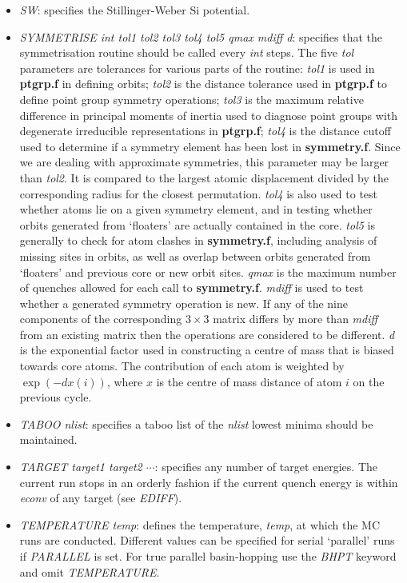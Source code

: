 \documentclass[12pt,a4paper,dvips]{article}
\begin{document}
\begin{itemize}
\item {\it SW\/}: specifies the Stillinger-Weber Si potential.

\item {\it SYMMETRISE int tol1 tol2 tol3 tol4 tol5 qmax mdiff d}: specifies that the symmetrisation
routine should be called every {\it int} steps. The five {\it tol} parameters are tolerances
for various parts of the routine: 
{\it tol1} is used in {\bf ptgrp.f} in defining orbits; 
{\it tol2} is the distance tolerance used in {\bf ptgrp.f} to define point group symmetry operations;
{\it tol3} is the maximum relative difference in principal moments of inertia used to
diagnose point groups with degenerate irreducible representations in {\bf ptgrp.f};
{\it tol4} is the distance cutoff used to determine if a symmetry element has been lost in {\bf symmetry.f}.
Since we are dealing with approximate symmetries, this parameter may be larger than {\it tol2}.
It is compared to the largest atomic displacement divided by the corresponding radius
for the closest permutation.
{\it tol4} is also used to test whether atoms lie on a given symmetry element, and in testing 
whether orbits generated from `floaters' are actually contained in the core.
{\it tol5} is generally to check for atom clashes in {\bf symmetry.f}, including analysis of
missing sites in orbits, as well as overlap between orbits generated from `floaters' and
previous core or new orbit sites.
{\it qmax} is the maximum number of quenches allowed for each call to {\bf symmetry.f}.
{\it mdiff} is used to test whether a generated symmetry operation is new. If any of the nine
components of the corresponding $3\times3$ matrix differs by more than {\it mdiff} from an
existing matrix then the operations are considered to be different.
{\it d} is the exponential factor used in constructing a centre of mass that is biased towards
core atoms. The contribution of each atom is weighted by $\exp(-dx(i))$, where $x$ is the 
centre of mass distance of atom $i$ on the previous cycle.

\item {\it TABOO nlist\/}: specifies a taboo list of the {\it nlist\/} lowest minima should be maintained.

\item {\it TARGET target1 target2 $\cdots$\/}: specifies any number of target energies. 
The current run stops in an orderly
fashion if the current quench energy is within {\it econv\/} of any target (see {\it EDIFF\/}).

\item {\it TEMPERATURE temp\/}: defines the temperature, {\it temp\/}, at which the 
MC runs are conducted. Different values can be specified for serial `parallel' runs if
{\it PARALLEL} is set.
For true parallel basin-hopping use the {\it BHPT\/} keyword and omit {\it TEMPERATURE\/}.


\end{itemize}
\end{document}
